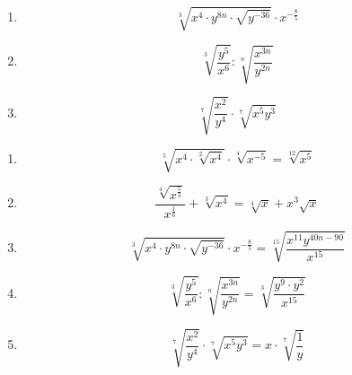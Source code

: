 {{\begin{multicols}{2}
\begin{enumerate}[label=\alph*)]
 \item $$\sqrt[3]{x^4\cdot{} y^{8n}\cdot{}  \sqrt{y^{-36}}} \cdot{} x^{-\frac85}$$

 \item $$ \sqrt[3]{\frac{y^5}{x^6}}   : \sqrt[n]{\frac{x^{3n}}{y^{2n}}}$$

 \item $$ \sqrt[7]{\frac{x^2}{y^4}}   \cdot \sqrt[7]{x^5y^3}$$
 \end{enumerate}
\end{multicols}

}{%
\begin{enumerate}[label=\alph*)]
  \item $$\sqrt[5]{x^4\cdot{}\sqrt[2]{x^4}} \cdot{} \sqrt[4]{x^{-5}}
    = \sqrt[12]{x^5}$$

  \item $$\frac{\sqrt[4]{x^{\frac53}}}{x^{\frac16}} + \sqrt[3]{x^4} =
    \sqrt[4]{x} + x^3\sqrt{x}$$

 \item $$\sqrt[3]{x^4\cdot{} y^{8n}\cdot{}  \sqrt{y^{-36}}} \cdot{}
   x^{-\frac85} = \sqrt[15]{\frac{x^11y^{40n-90}}{x^{15}}}$$

 \item $$ \sqrt[3]{\frac{y^5}{x^6}}   :
   \sqrt[n]{\frac{x^{3n}}{y^{2n}}} = \sqrt[3]{\frac{y^9\cdot{}y^2}{x^{15}}}$$

 \item $$ \sqrt[7]{\frac{x^2}{y^4}}   \cdot \sqrt[7]{x^5y^3} =
   x\cdot{} \sqrt[7]{\frac1y}$$

\end{enumerate}
}%









}
